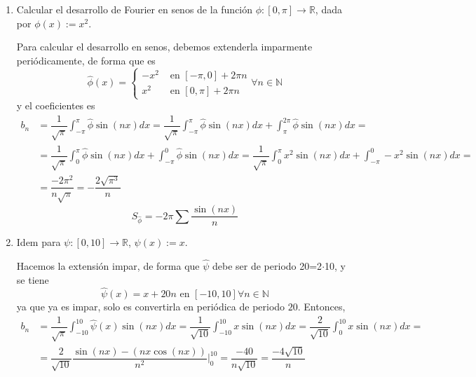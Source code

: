 \begin{enumerate}
\begin{sol}
    \end{sol}
    \item Calcular el desarrollo de Fourier en senos de la función $\phi: [0, \pi] \longrightarrow \mathbb R$, dada por $\phi(x) := x^2$.
    \begin{sol}
        Para calcular el desarrollo en senos, debemos extenderla imparmente periódicamente, de forma que es
        $$\hat{\phi}(x)=\left\{ \begin{array}{ll} -x^2 & \text{ en } [-\pi,0]+2\pi n \\ x^2 & \text{ en } [0, \pi]+2\pi n
        \end{array} \right. \forall n \in \mathbb N$$
        y el coeficientes es
        \begin{equation*}\begin{split}
        b_n&= \dfrac{1}{\sqrt{\pi}} \int_{-\pi}^{\pi} \hat{\phi} \sin(nx) dx =\dfrac{1}{\sqrt{\pi}} \int_{-\pi}^{\pi}\hat{\phi} \sin(nx) dx +\int_{\pi}^{2\pi} \hat{\phi} \sin(nx) dx = \\
         &=\dfrac{1}{\sqrt{\pi}} \int_0^{\pi} \hat{\phi} \sin(nx) dx +\int_{-\pi}^{0} \hat{\phi} \sin(nx) dx =\dfrac{1}{\sqrt{\pi}} \int_0^{\pi} x^2 \sin(nx) dx +\int_{-\pi}^{0} -x^2 \sin(nx) dx= \\
         &=\dfrac{-2\pi^2}{n\sqrt{\pi}} =-\dfrac{2\sqrt{\pi^3}}{n} 
        \end{split}           
        \end{equation*}
        $$S_{\hat{\phi}}=-2\pi\sum \dfrac{\sin(nx)}{n} $$
    \end{sol}
    \item Idem para $\psi: [0, 10] \longrightarrow \mathbb R$, $\psi(x) := x$.
    \begin{sol}
        Hacemos la extensión impar, de forma que $\hat{\psi}$ debe ser de periodo 20=2$\cdot$10, y se tiene
        $$\hat{\psi}(x)= x + 20n\text{ en } [-10,10]\forall n \in \mathbb N$$
        ya que ya es impar, solo es convertirla en periódica de periodo $20$. Entonces, 
        \begin{equation*}\begin{split}
        b_n&=\dfrac{1}{\sqrt{\pi}} \int_{-10}^{10} \hat{\psi}(x) \sin(nx) dx =\dfrac{1}{\sqrt{10}} \int_{-10}^{10} x \sin(nx) dx = \dfrac{2}{\sqrt{10}} \int_{0}^{10} x \sin(nx) dx = \\
        &=\dfrac{2}{\sqrt{10}} \dfrac{ \sin(n x)-(n x \cos(n x))}{n^2} \Big|_0^{10} = \dfrac{-40}{n\sqrt{10}}= \dfrac{-4\sqrt{10}}{n}
        \end{split}           

\end{equation*}
\end{sol}
\end{enumerate}

